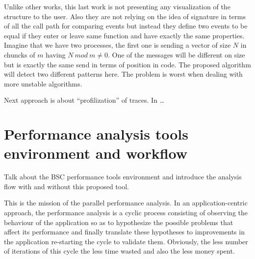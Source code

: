 Unlike other works, this last work is not presenting any visualization of the
structure to the user. Also they are not relying on the idea of signature in
terms of all the call path for comparing events but instead they define two 
events to be equal if they enter or leave same function and have exactly the
same properties. Imagine that we have two processes, the first one is sending a
vector of size $N$ in chuncks of $m$ having $N\:mod\: m \neq 0$. One of the messages
will be different on size but is exactly the same send in terms of position in
code. The proposed algorithm will detect two different patterns here. The
problem is worst when dealing with more unstable algorithms.

Next approach is about “profilization” of traces.
In \cite{saviankou2015cube} 
\dots

\section{Performance analysis tools environment and workflow}\label{s:pt_evironment}


Talk about the BSC performance tools environment and introduce the analysis flow
with and without this proposed tool.

This is the mission of the parallel performance analysis. In an application-centric
approach, the performance analysis is a cyclic process consisting of observing 
the behaviour of the application so as to hypothesize the possible problems that 
affect its performance and finally translate these hypotheses to improvements in
the application re-starting the cycle to validate them. Obviously, the less number 
of iterations of this cycle the less time wasted and also the less money spent.




